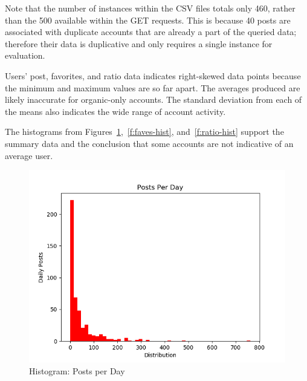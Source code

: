 Note that the number of instances within the CSV files totals only 460, rather
than the 500 available within the GET requests. This is because 40 posts are
associated with duplicate accounts that are already a part of the queried data;
therefore their data is duplicative and only requires a single instance for
evaluation. 

Users' post, favorites, and ratio data indicates right-skewed data points
because the minimum and maximum values are so far apart. The averages produced
are likely inaccurate for organic-only accounts. The standard deviation from
each of the means also indicates the wide range of account activity.

The histograms from Figures~\ref{f:post-hist},~\ref{f:faves-hist},
and~\ref{f:ratio-hist} support the summary data and the conclusion that some
accounts are not indicative of an average user.

\begin{figure}[!ht]
  \centering\includegraphics[width=\columnwidth]{images/post_hist.png}
  \caption{Histogram: Posts per Day}\label{f:post-hist}
\end{figure}

